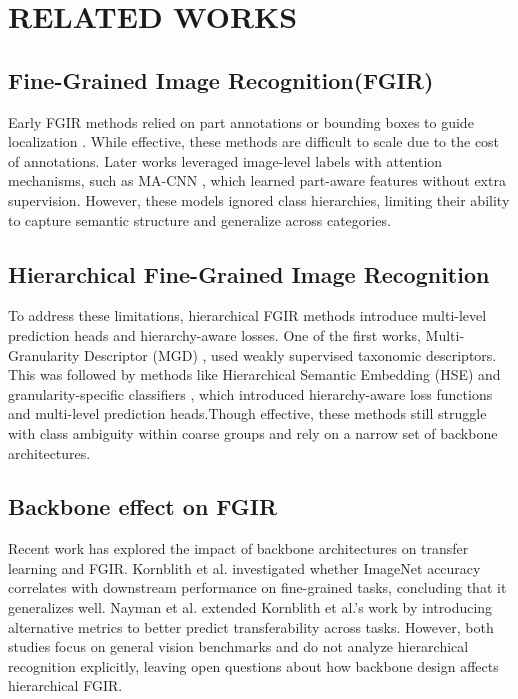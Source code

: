 \documentclass[sigconf, screen, review, anonymous]{acmart}
\begin{document}
\section{RELATED WORKS}
\subsection{Fine-Grained Image Recognition(FGIR)}
Early FGIR methods relied on part annotations or bounding boxes to guide localization \cite{zhang_part-based_2014}. While effective, these methods are difficult to scale due to the cost of annotations.  Later works leveraged image-level labels with attention mechanisms, such as MA-CNN \cite{zheng_learning_2017}, which learned part-aware features without extra supervision. However, these models ignored class hierarchies, limiting their ability to capture semantic structure and generalize across categories.

\subsection{Hierarchical Fine-Grained Image Recognition}
To address these limitations, hierarchical FGIR methods introduce multi-level prediction heads and hierarchy-aware losses. One of the first works, Multi-Granularity Descriptor (MGD) \cite{wang_multiple_2015}, used weakly supervised taxonomic descriptors. This was followed by methods like Hierarchical Semantic Embedding (HSE) \cite{chen_fine-grained_2018} and granularity-specific classifiers \cite{chang_your_2021}, which introduced hierarchy-aware loss functions and multi-level prediction heads.Though effective, these methods still struggle with class ambiguity within coarse groups and rely on a narrow set of backbone architectures.

\subsection{Backbone effect on FGIR}
Recent work has explored the impact of backbone architectures on transfer learning and FGIR. Kornblith et al. \cite{kornblith_better_2019} investigated whether ImageNet accuracy correlates with downstream performance on fine-grained tasks, concluding that it generalizes well. Nayman et al. \cite{nayman_diverse_2022} extended Kornblith et al.'s work by introducing alternative metrics to better predict transferability across tasks. However, both studies focus on general vision benchmarks and do not analyze hierarchical recognition explicitly, leaving open questions about how backbone design affects hierarchical FGIR.
\end{document}
